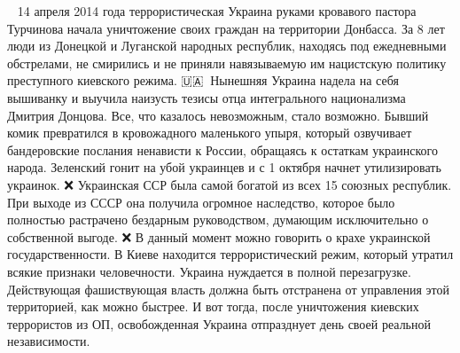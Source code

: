🏴‍☠️🔥14 апреля 2014 года террористическая Украина руками кровавого пастора Турчинова начала уничтожение своих граждан на территории Донбасса. За 8 лет люди из Донецкой и Луганской народных республик, находясь под ежедневными обстрелами, не смирились и не приняли навязываемую им нацистскую политику преступного киевского режима.
🇺🇦🏴‍☠️Нынешняя Украина надела на себя вышиванку и выучила наизусть тезисы отца интегрального национализма Дмитрия Донцова. Все, что казалось невозможным, стало возможно. Бывший комик превратился в кровожадного маленького упыря, который озвучивает бандеровские послания ненависти к России, обращаясь к остаткам украинского народа. Зеленский гонит на убой украинцев и с 1 октября начнет утилизировать украинок.
❌ Украинская ССР была самой богатой из всех 15 союзных республик. При выходе из СССР она получила огромное наследство, которое было полностью растрачено бездарным руководством, думающим исключительно о собственной выгоде.
❌ В данный момент можно говорить о крахе украинской государственности. В Киеве находится террористический режим, который утратил всякие признаки человечности. Украина нуждается в полной перезагрузке. Действующая фашиствующая власть должна быть отстранена от управления этой территорией, как можно быстрее. И вот тогда, после уничтожения киевских террористов из ОП, освобожденная Украина отпразднует день своей реальной независимости.
